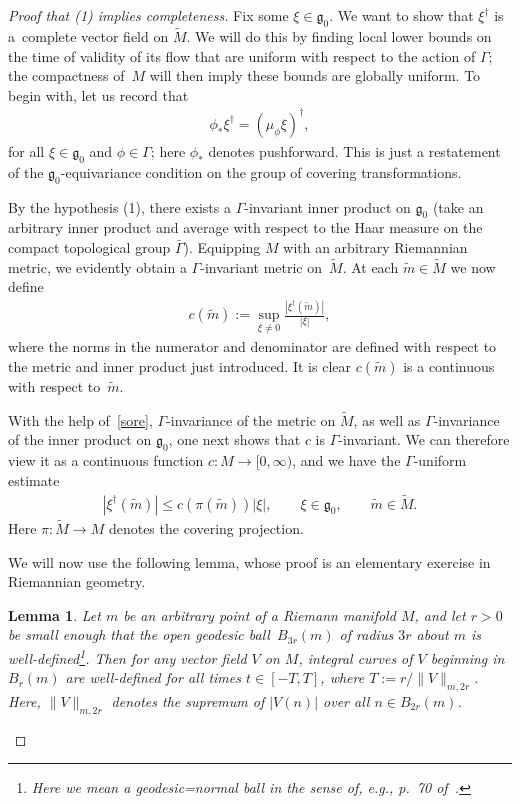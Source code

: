 \documentclass[pdftex]{sigma}
\renewcommand{\le}{\leqslant} \renewcommand{\ge}{\geqslant}
\numberwithin{equation}{section}
\newtheorem{LemmaBlaom}[TheoremBlaom]{Lemma}
\begin{document}
\begin{proof}[Proof that (1) implies completeness]
  Fix some $\xi\in {\mathfrak g}_0$. We want to show that
  $\xi^\dagger$ is a~complete vector f\/ield on $\tilde M$. We will do
  this by f\/inding local lower bounds on the time of validity of its
  f\/low that are uniform with respect to the action of $\Gamma$; the
  compactness of~$M$ will then imply these bounds are globally
  uniform. To begin with, let us record that
  \begin{gather}
    \phi_*\xi^\dagger = (\mu_\phi \xi)^\dagger,\label{sore}
  \end{gather}
  for all $\xi \in {\mathfrak g}_0$ and $\phi \in \Gamma$; here
  $\phi_*$ denotes pushforward. This is just a restatement of the
  ${\mathfrak g}_0$-equivariance condition on the group of covering
  transformations.

  By the hypothesis (1), there exists a $\Gamma$-invariant
  inner product on ${\mathfrak g}_0$ (take an arbitrary inner product
  and average with respect to the Haar measure on the compact
  topological group $\bar \Gamma$). Equipping $M$ with an arbitrary
  Riemannian metric, we evidently obtain a $\Gamma$-invariant metric
  on~$\tilde M$.  At each $\tilde m\in \tilde M$ we now def\/ine
  \begin{gather*}
    c(\tilde m):=\sup_{\xi\neq 0}\frac{|\xi^\dagger(\tilde m)|}{|\xi |},
  \end{gather*}
  where the norms in the numerator and denominator are def\/ined with
  respect to the metric and inner product just introduced. It is clear
  $c(\tilde m)$ is a continuous with respect to~$\tilde m$.


With the help of~\eqref{sore}, $\Gamma$-invariance of the metric on
  $\tilde M$, as well as $\Gamma$-invariance of the inner product on
  ${\mathfrak g}_0$, one next shows that $c$ is $\Gamma$-invariant. We
  can therefore view it as a continuous function $c\colon M \rightarrow
  [0,\infty)$, and we have the $\Gamma$-uniform estimate
\begin{gather}
  |\xi^\dagger(\tilde m)|\le c(\pi(\tilde m))|\xi|,
  \qquad\xi\in {\mathfrak g}_0,\qquad \tilde m\in \tilde M. \label{esti}
\end{gather}
Here $\pi\colon \tilde M \rightarrow M$ denotes the covering
projection.

We will now use the following lemma, whose proof is an elementary
exercise in Riemannian geometry.
  \begin{LemmaBlaom}\label{Lemma6.4}
    Let $m$ be an arbitrary point of a Riemann manifold $ M$, and let
    $r>0$ be small enough that the open geodesic ball~$B_{3r}(m)$ of
    radius $3r$ about $m$ is well-defined\footnote{Here we mean a
      geodesic=normal ball in the sense of, e.g., p.~70 of~\cite{doCarmo_92}.}. Then for any vector field $V$ on $M$,
    integral curves of $V$ beginning in $B_{r}(m)$ are well-defined
    for all times $t\in[-T,T]$, where $T:=r/\|V\|_{m,2r}$. Here,
    $\|V\|_{m,2r}$ denotes the supremum of $|V(n)|$ over all $n\in
    B_{2r}(m)$.
  \end{LemmaBlaom}


\end{proof}
\end{document}
